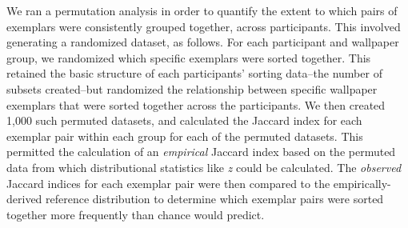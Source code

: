 \documentclass[11pt, twoside]{article}
\begin{document}
We ran a permutation analysis in order to quantify the extent to which pairs of exemplars were consistently grouped together, across participants. This involved generating a randomized dataset, as follows. For each participant and wallpaper group, we randomized which specific exemplars were sorted together. This retained the basic structure of each participants' sorting data--the number of subsets created--but randomized the relationship between specific wallpaper exemplars that were sorted together across the participants. We then created 1,000 such permuted datasets, and calculated the Jaccard index for each exemplar pair within each group for each of the permuted datasets. This permitted the calculation of an \emph{empirical} Jaccard index based on the permuted data from which distributional statistics like \textit{z} could be calculated. The \emph{observed} Jaccard indices for each exemplar pair were then compared to the empirically-derived reference distribution to determine which exemplar pairs were sorted together more frequently than chance would predict.

\begin{multicols}{2}
\small
 

\end{multicols}

\end{document}
